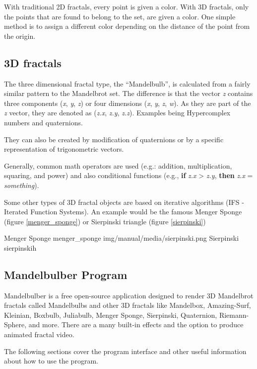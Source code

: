 With traditional 2D fractals, every point is given a color. With 3D fractals,
only the points that are found to belong to the set, are given a color.
One simple method is to assign a different color depending on the distance of the point from the origin.

\subsection{3D fractals}\label{d-fractals}

The three dimensional fractal type, the ``Mandelbulb'', is calculated from a
fairly similar pattern to the Mandelbrot set. The difference is that the vector
\emph{z} contains three components (\emph{x}, \emph{y}, \emph{z}) or four
dimensions (\emph{x}, \emph{y}, \emph{z}, \emph{w}). As they are part of the
\emph{z} vector, they are denoted as (\emph{z.x}, \emph{z.y}, \emph{z.z}).
Examples being Hypercomplex numbers and quaternions.

They can also be created by modification of quaternions or by a specific
representation of trigonometric vectors. 

Generally, common math operators are
used (e.g.: addition, multiplication, squaring, and power) and also
conditional functions (e.g., \textbf{if} \emph{z.x} \textgreater{} \emph{z.y},
\textbf{then} \emph{z.x} = \emph{something}).

Some other types of 3D fractal objects are based on iterative algorithms (IFS -
Iterated Function Systems). An example would be the famous Menger Sponge (figure \ref{menger_sponge}) or Sierpinski triangle (figure \ref{sierpinski})
\nopagebreak

{Menger Sponge}
{menger_sponge}
{img/manual/media/sierpinski.png}
{Sierpinski}
{sierpinski}{h}

\subsection{Mandelbulber Program}\label{mandelbulber-program}


Mandelbulber is a free open-source application designed to render 3D
Mandelbrot fractals called Mandelbulbs and other 3D fractals like
Mandelbox, Amazing-Surf, Kleinian, Boxbulb, Juliabulb, Menger Sponge, Sierpinski, Quaternion, Riemann-Sphere, and more. There are a many built-in effects and the option to produce animated fractal video.


The following sections
cover the program interface and other useful information about how to use the program.
